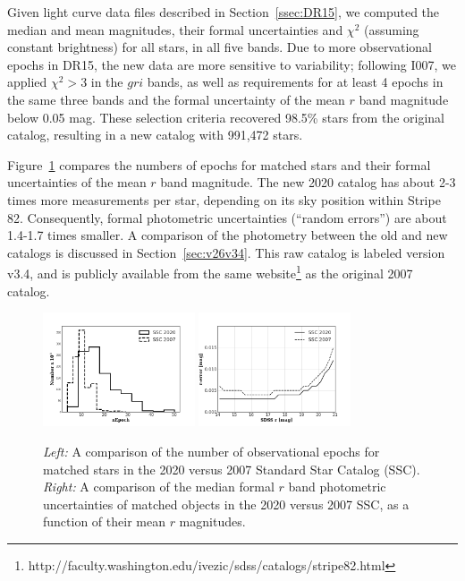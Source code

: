 \documentclass[fleqn,usenatbib]{mnras}
\newcommand{\pO}{\hbox{I007}}
\begin{document}
Given light curve data files described in Section~\ref{ssec:DR15}, we computed the median 
and mean magnitudes, their formal uncertainties and $\chi^2$ (assuming constant brightness)
for all stars, in all five bands. Due to more observational epochs in DR15, the new data are more 
sensitive to variability; following \pO, we applied $\chi^2>3$ in the $gri$ bands, as well as  
requirements for at least 4 epochs in the same three bands and the formal uncertainty of the 
mean $r$ band magnitude below 0.05 mag. These selection criteria recovered 98.5\% stars from
the original catalog, resulting in a new catalog with 991,472 stars. 

Figure~\ref{fig:rerr_nvso} compares the numbers of epochs for matched stars and their formal
uncertainties of the mean $r$ band magnitude. The new 2020 catalog has about 2-3 times more 
measurements per star, depending on its sky position within Stripe 82. Consequently,  formal 
photometric uncertainties (``random errors'') are about 1.4-1.7 times smaller. A comparison of the photometry between the old and new catalogs is discussed in Section~\ref{sec:v26v34}. This raw catalog
is labeled version v3.4, and is publicly available from the same
website\footnote{http://faculty.washington.edu/ivezic/sdss/catalogs/stripe82.html} 
as the original 2007 catalog. 



\begin{figure}
\centering
\includegraphics[width=0.4\textwidth, keepaspectratio]{figures/nepoch_compOvsN_BW.png}
\includegraphics[width=0.4\textwidth, keepaspectratio]{figures/rerr_compOvsN_BW.png}
\caption{{\it Left:} A comparison of the number of observational epochs for matched stars in the 2020 versus 2007 Standard Star Catalog (SSC). {\it Right:} A comparison of the median formal $r$ band photometric uncertainties of matched objects in the 2020 versus 2007 SSC, as a function of their mean $r$ magnitudes.
\label{fig:rerr_nvso}}
\end{figure}
\end{document}
